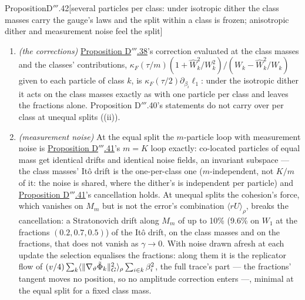 \begin{thm}{Proposition}{D$'''$.42}[several particles per class: under isotropic dither the class masses carry the
gauge's laws and the split within a class is frozen; anisotropic dither and measurement noise feel the
split]
\begin{enumerate}[label=\textup{(\roman*)}]
    component and is orthogonal to the class masses' tangent in the flow's metric). At finite $\gamma$ an
    $O(\gamma^2\tau)$ drift moves the fractions toward the equal split. For an anisotropic position noise ---
    Proposition D$'''$.40's masks --- the frozen split and the per-class law hold at the equal split (the per-class law
    to the resolution of the computation, after extrapolating its second derivatives' step) but not at unequal ones:
    there the fractions drift at $O(\gamma\tau)$ and the class masses' drift departs from the per-class law at
    $O(\gamma\tau)$; a noise on the centres and widths only, which freezes the gauge with one particle per class
    (Proposition D$'''$.40), moves the class masses at $O(\gamma\tau)$.
  \item \emph{(the corrections)} \hyperref[res:thmDppp:38]{Proposition D$'''$.38}'s correction evaluated at the class
    masses and the classes' contributions, $\kappa_F(\tau/m)(1 + \hat W_k^2/W_k^2)/(W_k - \hat W_k^2/W_k)$ given to each
    particle of class $k$, is $\kappa_F(\tau/2)\partial_{\beta_i}\ell_1$: under the isotropic dither it acts on the class
    masses exactly as with one particle per class and leaves the fractions alone. Proposition D$'''$.40's statements do
    not carry over per class at unequal splits ((ii)).
  \item \emph{(measurement noise)} At the equal split the $m$-particle loop with measurement noise is
    \hyperref[res:thmDppp:41]{Proposition D$'''$.41}'s $m = K$ loop exactly: co-located particles of equal mass get
    identical drifts and identical noise fields, an invariant subspace --- the class masses' It\^o drift is the
    one-per-class one ($m$-independent, not $K/m$ of it: the noise is shared, where the dither's is independent per
    particle) and \hyperref[res:thmDppp:41]{Proposition D$'''$.41}'s cancellation holds. At unequal splits the
    cohesion's force, which vanishes on $M_m$ but is not the error's combination $\langle rU\rangle_\rho$, breaks the
    cancellation: a Stratonovich drift along $M_m$ of up to 10\% (9.6\% on $W_1$ at the fractions $(0.2, 0.7, 0.5)$) of
    the It\^o drift, on the class masses and on the fractions, that does not vanish as $\gamma\to0$. With noise drawn
    afresh at each update the selection equalises the fractions: along them it is the replicator flow of
    $(v/4)\sum_k\langle\lVert \nabla_\vartheta\tilde\Phi_k\rVert^2_G\rangle_\rho\sum_{i\in k}\beta_i^2$, the full trace's part
    --- the fractions' tangent moves no position, so no amplitude correction enters ---, minimal at the equal split for
    a fixed class mass.
\end{enumerate}
\end{thm}

